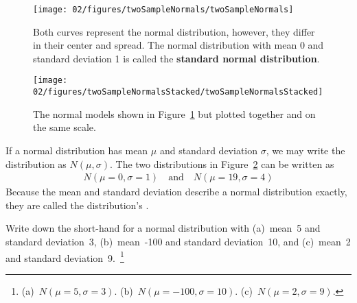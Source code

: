 \begin{figure}[hht]
\centering
\texttt{[image: 02/figures/twoSampleNormals/twoSampleNormals]}
\caption{Both curves represent the normal distribution, however, they differ in their center and spread. The normal distribution with mean 0 and standard deviation 1 is called the \textbf{standard normal distribution}.}
\label{twoSampleNormals}
\end{figure}

\begin{figure}[hht]
\centering
\texttt{[image: 02/figures/twoSampleNormalsStacked/twoSampleNormalsStacked]}
\caption{The normal models shown in Figure~\ref{twoSampleNormals} but plotted together and on the same scale.}
\label{twoSampleNormalsStacked}
\end{figure}

If a normal distribution has mean $\mu$ and standard deviation $\sigma$, we may write the distribution as $N(\mu, \sigma)$. The two distributions in Figure~\ref{twoSampleNormalsStacked} can be written as
\begin{align*}
N(\mu=0,\sigma=1)\quad\text{and}\quad N(\mu=19,\sigma=4)
\end{align*}
Because the mean and standard deviation describe a normal distribution exactly, they are called the distribution's .

\begin{exercise}
Write down the short-hand for a normal distribution with (a)~mean~5 and standard deviation~3, (b)~mean~-100 and standard deviation~10, and (c)~mean~2 and standard deviation~9.~\footnote{(a)~$N(\mu=5,\sigma=3)$. (b)~$N(\mu=-100, \sigma=10)$. (c)~$N(\mu=2, \sigma=9)$.}
\end{exercise}


